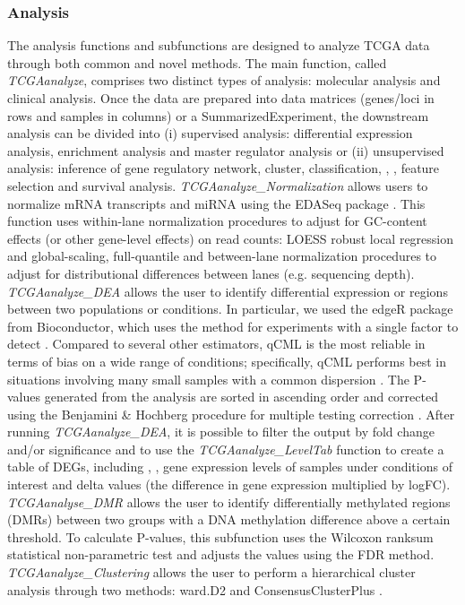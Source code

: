\subsubsection*{Analysis}
The analysis functions and subfunctions are designed to analyze TCGA data through both common and novel methods.
The main function, called \textit{TCGAanalyze}, comprises two distinct types of analysis: molecular analysis and clinical analysis. Once the data are prepared into data matrices
(genes/loci in rows and samples in columns) or a SummarizedExperiment, the downstream
analysis can be divided into (i) supervised analysis: differential expression analysis, enrichment analysis and master regulator analysis or (ii) unsupervised analysis: inference of gene regulatory network, cluster, classification,  \cite{sonego2008roc}, , feature selection and survival analysis.
\textit{TCGAanalyze\_Normalization} allows users to normalize mRNA transcripts and miRNA using the EDASeq package \cite{risso2011gc}. This function uses within-lane normalization procedures to adjust for GC-content effects (or other gene-level effects) on read counts: LOESS robust local regression and global-scaling, full-quantile and between-lane normalization procedures to adjust for distributional differences between lanes (e.g. sequencing depth).
\textit{TCGAanalyze\_DEA} allows the user to identify differential expression or regions between two populations or conditions.
In particular, we used the edgeR package from
Bioconductor, which uses the  method for experiments with
a single factor to detect  \cite{robinson2010edger}. Compared to several other estimators, qCML is the most reliable in terms of bias on a wide range of conditions; specifically, qCML performs best in situations involving many small samples with a common dispersion \cite{robinson2007small}. The P-values generated from the analysis are sorted in ascending order and corrected using the Benjamini \& Hochberg procedure for multiple testing correction \cite{Ben95}.
After running \textit{TCGAanalyze\_DEA}, it is possible to filter the output by fold change and/or significance and to use the \textit{TCGAanalyze\_LevelTab} function to create a table of DEGs, including , , gene expression levels of samples under conditions of interest and delta values (the difference in gene expression multiplied by logFC).
\textit{TCGAanalyse\_DMR} allows the user to identify differentially methylated regions (DMRs) between two groups with a DNA methylation difference above a certain threshold. To calculate P-values, this subfunction uses the Wilcoxon ranksum statistical non-parametric test and adjusts the values using the FDR method.
\textit{TCGAanalyze\_Clustering} allows the user to perform a hierarchical cluster analysis through two methods: ward.D2 and ConsensusClusterPlus \cite{wilkerson2010consensusclusterplus}.


